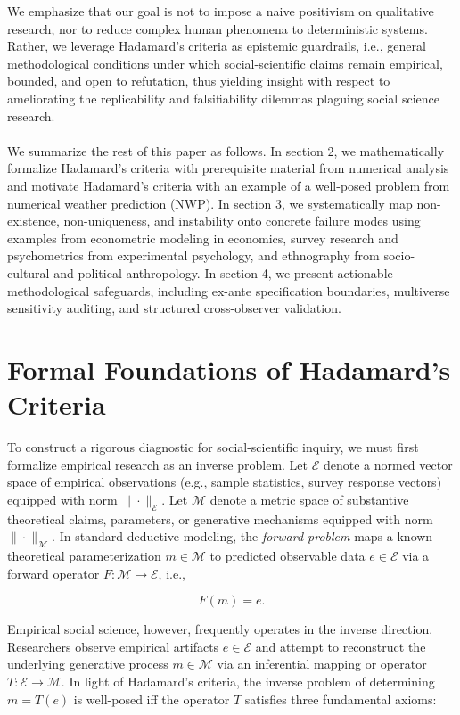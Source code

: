 \documentclass{article}
\theoremstyle{definition}
\begin{document}
\noindent
We emphasize that our goal is not to impose a naive positivism on qualitative research, nor to reduce complex human phenomena to deterministic systems. Rather, we leverage Hadamard’s criteria as epistemic guardrails, i.e., general methodological conditions under which social-scientific claims remain empirical, bounded, and open to refutation, thus yielding insight with respect to ameliorating the replicability and falsifiability dilemmas plaguing social science research. \\
\\
We summarize the rest of this paper as follows. In section 2, we mathematically formalize Hadamard's criteria with prerequisite material from numerical analysis and motivate Hadamard's criteria with an example of a well-posed problem from numerical weather prediction (NWP). In section 3, we systematically map non-existence, non-uniqueness, and instability onto concrete failure modes using examples from econometric modeling in economics, survey research and psychometrics from experimental psychology, and ethnography from socio-cultural and political anthropology. In section 4, we present actionable methodological safeguards, including ex-ante specification boundaries, multiverse sensitivity auditing, and structured cross-observer validation.

\section{Formal Foundations of Hadamard's Criteria}

To construct a rigorous diagnostic for social-scientific inquiry, we must first formalize empirical research as an inverse problem. Let $\mathcal{E}$ denote a normed vector space of empirical observations (e.g., sample statistics, survey response vectors) equipped with norm $\|\cdot\|_\mathcal{E}$. Let $\mathcal{M}$ denote a metric space of substantive theoretical claims, parameters, or generative mechanisms equipped with norm $\|\cdot\|_\mathcal{M}$. In standard deductive modeling, the \textit{forward problem} maps a known theoretical parameterization $m \in \mathcal{M}$ to predicted observable data $e \in \mathcal{E}$ via a forward operator $F: \mathcal{M} \to \mathcal{E}$, i.e., 

\begin{equation}
    F(m) = e.
\end{equation}

\noindent
Empirical social science, however, frequently operates in the inverse direction. Researchers observe empirical artifacts $e \in \mathcal{E}$ and attempt to reconstruct the underlying generative process $m \in \mathcal{M}$ via an inferential mapping or operator $T: \mathcal{E} \to \mathcal{M}$. In light of Hadamard's criteria, the inverse problem of determining $m = T(e)$ is well-posed iff the operator $T$ satisfies three fundamental axioms:
\end{document}
